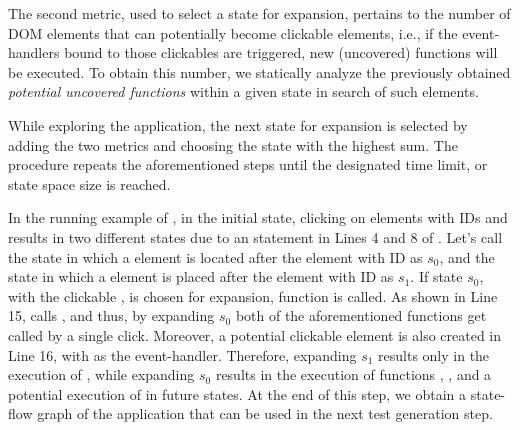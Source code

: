 The second metric, used to select a state for expansion, pertains to the number of DOM elements that can potentially become clickable elements, i.e., if the event-handlers bound to those clickables are triggered, new (uncovered) functions will be executed. To obtain this number, we statically analyze the previously obtained \emph{potential uncovered functions} within a given state in search of such elements.

While exploring the application, the next state for expansion is selected by adding the two metrics 
and choosing the state with the highest sum.
%
The procedure repeats the aforementioned steps until the designated time limit, or state space size is reached. %

In the running example of , in the initial state, clicking on elements with IDs  and  results in two different states due to an  statement in Lines 4 and 8 of . Let's call the state in which a  element is located after the element with ID  as $s_0$, and the state in which a  element is placed after the element with ID   as $s_1$. If state $s_0$, with the clickable , is chosen for expansion, function  is called. As shown in Line 15,  calls , and thus, by expanding $s_0$ both of the aforementioned functions get called by a single click. Moreover, a potential clickable element is also created in Line 16, with  as the event-handler. Therefore,  expanding $s_1$  results only in the execution of , while expanding $s_0$ results in the execution of functions , , and a potential execution of  in future states. 
At the end of this step, we obtain a state-flow graph of the application that can be used in the next test generation step.
